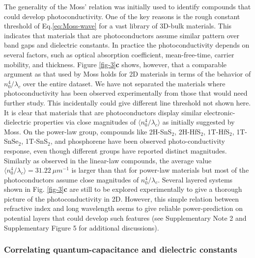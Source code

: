 \documentclass[journal=ancac3,manuscript=article,email=true,hyperref=true,keywords=true]{achemso}
\begin{document}
The generality of the Moss' relation was initially used to identify compounds that 
could develop photoconductivity\cite{Moss_1950_relation,Moss-book1}. 
One of the key reasons is the rough constant threshold of Eq.\ref{eq:Moss-wave} for a vast 
library of 3D-bulk materials. This indicates that materials that are photoconductors assume 
similar pattern over band gaps and dielectric constants. 
In practice the photoconductivity depends on several factors, such as optical absorption coefficient, 
mean-free-time, carrier mobility, and thickness. Figure \ref{fig-3}{\bf c} shows, however, 
that a comparable argument as that used by Moss 
holds for 2D materials in terms of  
the behavior of $n_{0}^{4}/\lambda_{c}$ over the entire dataset. 
We have not separated the materials where photoconductivity has been observed 
experimentally from those that would need further study. This incidentally could give different 
line threshold not shown here. It is clear that materials that are photoconductors display 
similar electronic-dielectric properties via close magnitudes of $ \langle n_{0}^{4}/\lambda_{c} \rangle$ 
as initially suggested by Moss\cite{Moss_1950_relation,Moss59book,Moss52book,Moss_1985_n_Eg}. 
On the power-law group, compounds like 2H-SnS$_2$, 
2H-HfS$_2$, 1T-HfS$_2$, 1T-SnSe$_2$, 1T-SnS$_2$, and phosphorene 
have been observed photo-conductivity response, even though different groups 
have reported distinct magnitudes\cite{photo-2Dmaterials,Andres15}. 
Similarly as observed in the 
linear-law compounds, the average value $ \langle n_{0}^{4}/\lambda_{c} \rangle=31.22~\mu m^{-1}$
is larger than that for power-law materials but most of the photoconductors 
assume close magnitudes of $n_{0}^{4}/\lambda_{c}$. Several layered systems 
shown in Fig. \ref{fig-3}{\bf c} are still to be explored experimentally 
to give a thorough picture of the photoconductivity in 2D. However, 
this simple relation between refractive index and 
long wavelength seems to give reliable power-prediction 
on potential layers that could develop such 
features (see Supplementary Note 2 and Supplementary Figure 5 for additional discussions). 





\subsubsection{Correlating quantum-capacitance and dielectric constants}
\end{document}

